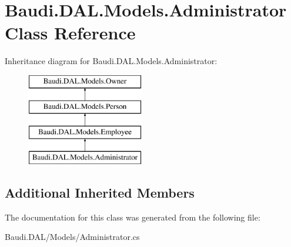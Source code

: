 \hypertarget{class_baudi_1_1_d_a_l_1_1_models_1_1_administrator}{}\section{Baudi.\+D\+A\+L.\+Models.\+Administrator Class Reference}
\label{class_baudi_1_1_d_a_l_1_1_models_1_1_administrator}
Inheritance diagram for Baudi.\+D\+A\+L.\+Models.\+Administrator\+:\begin{figure}[H]
\begin{center}
\leavevmode
\includegraphics[height=4.000000cm]{class_baudi_1_1_d_a_l_1_1_models_1_1_administrator}
\end{center}
\end{figure}
\subsection*{Additional Inherited Members}


The documentation for this class was generated from the following file\+:\begin{DoxyCompactItemize}
\item 
Baudi.\+D\+A\+L/\+Models/Administrator.\+cs\end{DoxyCompactItemize}
